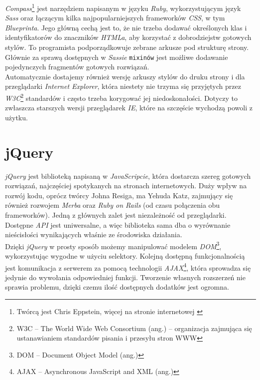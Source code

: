 \documentclass[12pt,twoside]{report}
\begin{document}
\emph{Compass}\footnote{Twórcą jest Chris Eppstein, więcej na stronie internetowej
\cite{compass}} jest narzędziem napisanym w języku \emph{Ruby}, wykorzystującym język
\emph{Sass} oraz łączącym kilka najpopularniejszych frameworków \emph{CSS}, w tym
\emph{Blueprinta}. Jego główną cechą jest to, że nie trzeba dodawać określonych klas i
identyfikatorów do znaczników \emph{HTMLa}, aby korzystać z dobrodziejstw gotowych stylów.
To programista podporządkowuje zebrane arkusze pod strukturę strony. Głównie za sprawą
dostępnych w \emph{Sassie} \texttt{mixinów} jest możliwe dodawanie pojedynczych
fragmentów gotowych rozwiązań.\\
Automatycznie dostajemy również wersję arkuszy stylów do druku strony i dla przeglądarki \emph{Internet
Explorer}, która niestety nie trzyma się przyjętych przez \emph{W3C}\footnote{W3C -- The
World Wide Web Consortium (ang.) -- organizacja zajmująca się ustanawianiem standardów pisania i
przesyłu stron WWW} standardów i często trzeba korygować jej niedoskonałości. Dotyczy to
zwłaszcza starszych wersji przeglądarek \emph{IE}, które na szczęście wychodzą powoli z
użytku.


\section{jQuery}
\emph{jQuery} jest biblioteką napisaną w \emph{JavaScripcie}, która dostarcza szereg
gotowych rozwiązań, najczęściej spotykanych na stronach internetowych. Duży wpływ na
rozwój kodu, oprócz twórcy Johna Resiga, ma Yehuda Katz, zajmujący się również rozwojem
\emph{Merba} oraz \emph{Ruby on Rails} (od czasu połączenia obu frameworków).
Jedną z głównych zalet jest niezależność od przeglądarki. Dostępne \emph{API} jest
uniwersalne, a więc biblioteka sama dba o wyrównanie nieścisłości wynikających właśnie ze
środowiska działania.\\
Dzięki \emph{jQuery} w prosty sposób możemy manipulować modelem \emph{DOM}\footnote{DOM --
Document Object Model (ang.)}, wykorzystując wygodne w użyciu selektory. Kolejną dostępną
funkcjonalnością jest komunikacja z serwerem za pomocą technologii
\emph{AJAX}\footnote{AJAX -- Asynchronous JavaScript and XML (ang.)}, która sprowadza się
jedynie do wywołania odpowiedniej funkcji. Tworzenie własnych rozszerzeń nie sprawia
problemu, dzięki czemu ilość dostępnych dodatków jest ogromna.
\end{document}
